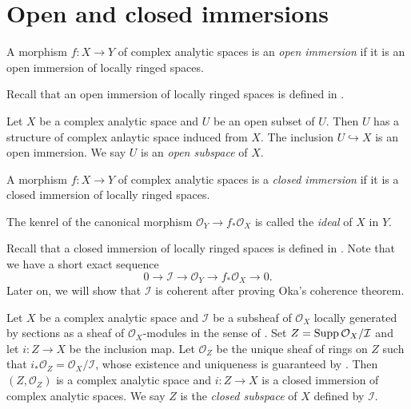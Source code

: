 \section{Open and closed immersions}

\begin{definition}
    A morphism $f:X\rightarrow Y$ of complex analytic spaces is an \emph{open immersion} if it is an open immersion of locally ringed spaces.
\end{definition}
Recall that an open immersion of locally ringed spaces is defined in \cite[\href{https://stacks.math.columbia.edu/tag/01HE}{Tag 01HE}]{stacks-project}.

\begin{example}
    Let $X$ be a complex analytic space and $U$ be an open subset of $U$. Then $U$ has a structure of complex anlaytic space induced from $X$. The inclusion $U\hookrightarrow X$ is an open immersion. We say $U$ is an \emph{open subspace} of $X$.
\end{example}

\begin{definition}
    A morphism $f:X\rightarrow Y$ of complex analytic spaces is a \emph{closed immersion} if it is a closed immersion of locally ringed spaces.

    The kenrel of the canonical morphism $\mathcal{O}_Y\rightarrow f_*\mathcal{O}_X$ is called the \emph{ideal} of $X$ in $Y$.
\end{definition}
Recall that a closed immersion of locally ringed spaces is defined in \cite[\href{https://stacks.math.columbia.edu/tag/01HK}{Tag 01HK}]{stacks-project}. Note that we have a short exact sequence
\[
    0\rightarrow \mathcal{I} \rightarrow \mathcal{O}_Y\rightarrow f_*\mathcal{O}_X\rightarrow 0.
\]
Later on, we will show that $\mathcal{I}$ is coherent after proving Oka's coherence theorem.

\begin{example}\label{ex-closedsubspace}
    Let $X$ be a complex analytic space and $\mathcal{I}$ be a subsheaf of $\mathcal{O}_X$ locally generated by sections as a sheaf of $\mathcal{O}_X$-modules in the sense of \cite[\href{https://stacks.math.columbia.edu/tag/01B2}{Tag 01B2}]{stacks-project}. Set $Z=\operatorname{Supp}\mathcal{O}_X/\mathcal{I}$ and let $i:Z\rightarrow X$ be the inclusion map. Let $\mathcal{O}_Z$ be the unique sheaf of rings on $Z$ such that $i_*\mathcal{O}_Z=\mathcal{O}_X/\mathcal{I}$, whose existence and uniqueness is guaranteed by \cite[\href{https://stacks.math.columbia.edu/tag/01AX}{Tag 01AX}]{stacks-project}. Then $(Z,\mathcal{O}_Z)$ is a complex analytic space and $i:Z\rightarrow X$ is a closed immersion of complex analytic spaces. We say $Z$ is the \emph{closed subspace} of $X$ defined by $\mathcal{I}$.
\end{example}

